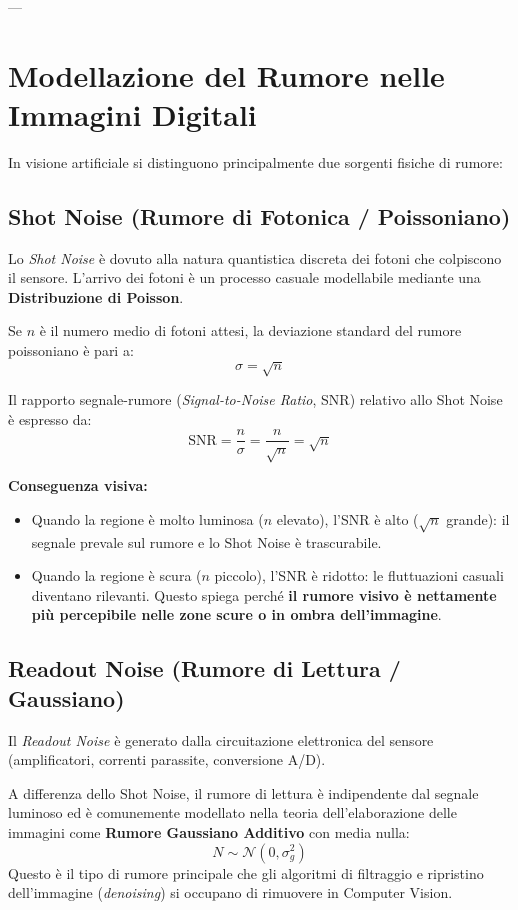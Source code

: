 ---

\section{Modellazione del Rumore nelle Immagini Digitali}

In visione artificiale si distinguono principalmente due sorgenti fisiche di rumore:

\subsection{Shot Noise (Rumore di Fotonica / Poissoniano)}
Lo \textit{Shot Noise} è dovuto alla natura quantistica discreta dei fotoni che colpiscono il sensore. L'arrivo dei fotoni è un processo casuale modellabile mediante una \textbf{Distribuzione di Poisson}.

Se $n$ è il numero medio di fotoni attesi, la deviazione standard del rumore poissoniano è pari a:
\begin{equation}
    \sigma = \sqrt{n}
\end{equation}

Il rapporto segnale-rumore (\textit{Signal-to-Noise Ratio}, SNR) relativo allo Shot Noise è espresso da:
\begin{equation}
    \text{SNR} = \frac{n}{\sigma} = \frac{n}{\sqrt{n}} = \sqrt{n}
\end{equation}

\textbf{Conseguenza visiva:}
\begin{itemize}
    \item Quando la regione è molto luminosa ($n$ elevato), l'SNR è alto ($\sqrt{n}$ grande): il segnale prevale sul rumore e lo Shot Noise è trascurabile.
    \item Quando la regione è scura ($n$ piccolo), l'SNR è ridotto: le fluttuazioni casuali diventano rilevanti. Questo spiega perché \textbf{il rumore visivo è nettamente più percepibile nelle zone scure o in ombra dell'immagine}.
\end{itemize}

\subsection{Readout Noise (Rumore di Lettura / Gaussiano)}
Il \textit{Readout Noise} è generato dalla circuitazione elettronica del sensore (amplificatori, correnti parassite, conversione A/D). 

A differenza dello Shot Noise, il rumore di lettura è indipendente dal segnale luminoso ed è comunemente modellato nella teoria dell'elaborazione delle immagini come \textbf{Rumore Gaussiano Additivo} con media nulla:
\begin{equation}
    N \sim \mathcal{N}(0, \sigma_g^2)
\end{equation}
Questo è il tipo di rumore principale che gli algoritmi di filtraggio e ripristino dell'immagine (\textit{denoising}) si occupano di rimuovere in Computer Vision.
